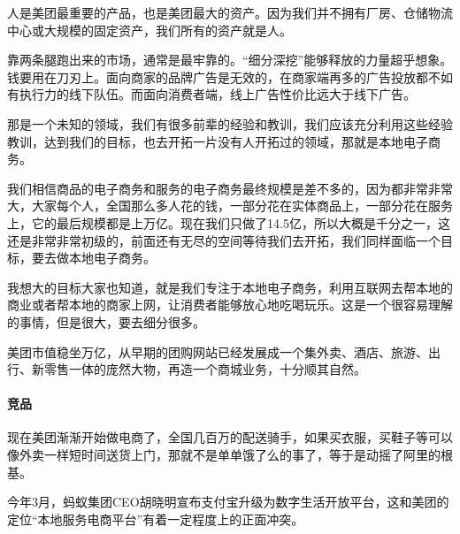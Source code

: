 \documentclass[letterpaper,10pt,english]{sphinxmanual}
\begin{document}
人是美团最重要的产品，也是美团最大的资产。因为我们并不拥有厂房、仓储物流中心或大规模的固定资产，我们所有的资产就是人。

靠两条腿跑出来的市场，通常是最牢靠的。“细分深挖”能够释放的力量超乎想象。钱要用在刀刃上。面向商家的品牌广告是无效的，在商家端再多的广告投放都不如有执行力的线下队伍。而面向消费者端，线上广告性价比远大于线下广告。

那是一个未知的领域，我们有很多前辈的经验和教训，我们应该充分利用这些经验教训，达到我们的目标，也去开拓一片没有人开拓过的领域，那就是本地电子商务。

我们相信商品的电子商务和服务的电子商务最终规模是差不多的，因为都非常非常大，大家每个人，全国那么多人花的钱，一部分花在实体商品上，一部分花在服务上，它的最后规模都是上万亿。现在我们只做了14.5亿，所以大概是千分之一，这还是非常非常初级的，前面还有无尽的空间等待我们去开拓，我们同样面临一个目标，要去做本地电子商务。

我想大的目标大家也知道，就是我们专注于本地电子商务，利用互联网去帮本地的商业或者帮本地的商家上网，让消费者能够放心地吃喝玩乐。这是一个很容易理解的事情，但是很大，要去细分很多。

美团市值稳坐万亿，从早期的团购网站已经发展成一个集外卖、酒店、旅游、出行、新零售一体的庞然大物，再造一个商城业务，十分顺其自然。%
\begin{footnote}[1026]\sphinxAtStartFootnote
{}
%
\end{footnote}


\paragraph{竞品}
\label{\detokenize{chapter_AI_company/meituan:id3}}
现在美团渐渐开始做电商了，全国几百万的配送骑手，如果买衣服，买鞋子等可以像外卖一样短时间送货上门，那就不是单单饿了么的事了，等于是动摇了阿里的根基。%
\begin{footnote}[1027]\sphinxAtStartFootnote
{}
%
\end{footnote}

今年3月，蚂蚁集团CEO胡晓明宣布支付宝升级为数字生活开放平台，这和美团的定位“本地服务电商平台”有着一定程度上的正面冲突。%
\begin{footnote}[1028]\sphinxAtStartFootnote
{}
%
\end{footnote}
\end{document}
